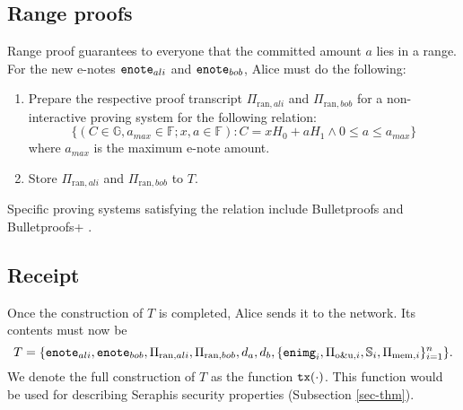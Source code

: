 \documentclass{article}
\theoremstyle{plain}
\theoremstyle{remark}
\begin{document}
\subsection{Range proofs}\label{range}
Range proof guarantees to everyone that the committed amount $a$ lies in a range.  For the new e-notes ${\tt enote}_{ali}$ and ${\tt enote}_{bob}$, Alice must do the following:
\begin{enumerate}
    \item Prepare the respective proof transcript $\Pi_{\text{ran}, ali}$ and $\Pi_{\text{ran}, bob}$ for a non-interactive proving system for the following relation:
$$\{(C \in\mathbb{G}, a_{max}\in\mathbb{F}; x, a\in\mathbb{F}): C = x H_0 + a H_1 \wedge 0\le a \le a_{max}\}$$
	where $a_{max}$ is the maximum e-note amount.
    \item Store $\Pi_{\text{ran}, ali}$ and $\Pi_{\text{ran}, bob}$ to $T$.
\end{enumerate}

Specific proving systems satisfying the relation include Bulletproofs \cite{bp} and Bulletproofs+ \cite{bp-plus}.

\subsection{Receipt}
Once the construction of $T$ is completed, Alice sends it to the network. Its contents must now be
$$T=\{{\tt enote}_{ali}, {\tt enote}_{bob}, \Pi_{\text{ran}, ali}, \Pi_{\text{ran}, bob}, d_a, d_b, \{{\tt enimg}_i, \Pi_{\text{o\&u}, i}, \mathbb{S}_i, \Pi_{\text{mem}, i}\}_{i=1}^n\}.$$
We denote the full construction of $T$ as the function ${\tt tx}(\cdot)$. This function would be used for describing Seraphis security properties (Subsection \ref{sec-thm}).
\end{document}
